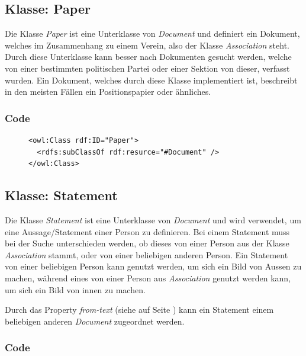 \documentclass[
    11pt,
    latin1,
    a4paper,
    oneside
]{scrreprt}
\begin{document}
\subsection{Klasse: Paper} \label{sec:class_paper}

Die Klasse \emph{Paper} ist eine Unterklasse von \emph{Document} und definiert ein Dokument, welches im Zusammenhang zu einem Verein, also der Klasse \emph{Association} steht. Durch diese Unterklasse kann besser nach Dokumenten gesucht werden, welche von einer bestimmten politischen Partei oder einer Sektion von dieser, verfasst wurden. Ein Dokument, welches durch diese Klasse implementiert ist, beschreibt in den meisten F\"allen ein Positionspapier oder \"ahnliches.

\subsubsection{Code} \label{sec:class_paper_code}

\begin{figure}[H]
 \lstset{language=XML}
 \begin{lstlisting}[label=owl:paper,caption={Die Klasse \emph{Paper} ist ein Dokument einer \emph{Association}, also eines partei/Gesellschaft}]
<owl:Class rdf:ID="Paper">
  <rdfs:subClassOf rdf:resurce="#Document" />
</owl:Class>
 \end{lstlisting}
\end{figure}


\subsection{Klasse: Statement} \label{sec:class_statement}

Die Klasse \emph{Statement} ist eine Unterklasse von \emph{Document} und wird verwendet, um eine Aussage/Statement einer Person zu definieren. Bei einem Statement muss bei der Suche unterschieden werden, ob dieses von einer Person aus der Klasse \emph{Association} stammt, oder von einer beliebigen anderen Person. Ein Statement von einer beliebigen Person kann genutzt werden, um sich ein Bild von Aussen zu machen, w\"ahrend eines von einer Person aus \emph{Association} genutzt werden kann, um sich ein Bild von innen zu machen.

Durch das Property \emph{from-text} (siehe  auf Seite \pageref{sec:res_fromtext}) kann ein Statement einem beliebigen anderen \emph{Document} zugeordnet werden.

\subsubsection{Code} \label{sec:class_statement_code}
\end{document}
